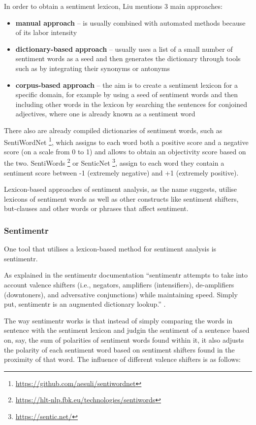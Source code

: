   
  In order to obtain a sentiment lexicon, Liu \cite{liu_2015} mentions 3 main approaches:
  \begin{itemize}
      \item \textbf{manual approach} -- is usually combined with automated methods because of its labor intensity
      \item \textbf{dictionary-based approach} -- usually uses a list of a small number of sentiment words as a seed and then generates the dictionary through tools such as \textcite{wordnet}   by integrating their synonyms or antonyms
      \item \textbf{corpus-based approach} -- the aim is to create a sentiment lexicon for a specific domain, for example by using a seed of sentiment words and then including other words in the lexicon by searching the sentences for conjoined adjectives, where one is already known as a sentiment word
  \end{itemize}
  There also are already compiled dictionaries of sentiment words, such as SentiWordNet \footnote{\url{https://github.com/aesuli/sentiwordnet}}, which assigns to each word both a positive score and a negative score (on a scale from 0 to 1) and allows to obtain an objectivity score based on the two. SentiWords \footnote{\url{https://hlt-nlp.fbk.eu/technologies/sentiwords}} or SenticNet \footnote{\url{https://sentic.net/}}, assign to each word they contain a sentiment score between -1 (extremely negative) and +1 (extremely positive).
  
  Lexicon-based approaches of sentiment analysis, as the name suggests, utilise lexicons of sentiment words as well as other constructs like sentiment shifters, but-clauses and other words or phrases that affect sentiment.
\subsubsection{Sentimentr}
One tool that utilises a lexicon-based method for sentiment analysis is sentimentr.

 As explained in the sentimentr documentation ``sentimentr attempts to take into account valence shifters (i.e., negators, amplifiers (intensifiers), de-amplifiers (downtoners), and adversative conjunctions) while maintaining speed. Simply put, sentimentr is an augmented dictionary lookup.'' \cite{sentimentr}.
 
The way sentimentr works is that instead of simply comparing the words in sentence with the sentiment lexicon and judgin the sentiment of a sentence based on, say, the sum of polarities of sentiment words found within it, it also adjusts the polarity of each sentiment word based on sentiment shifters found in the proximity of that word. The influence of different valence shifters is as follows:

